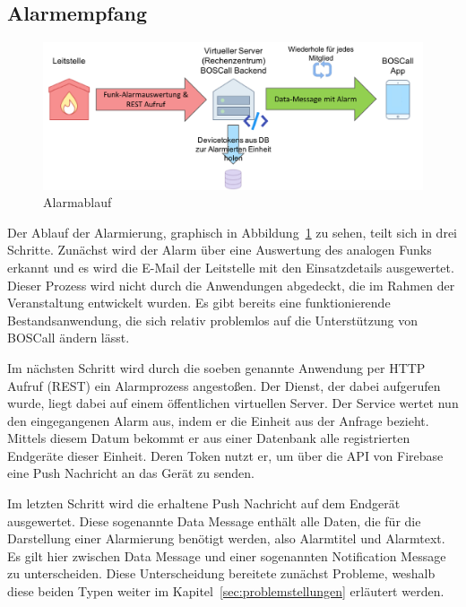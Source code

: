 \subsection{Alarmempfang}
\begin{figure}[H]
	\centering
	\includegraphics[width=\linewidth]{include/img/alarmablauf}
	\caption{Alarmablauf}
	\label{fig:alarmablauf}
\end{figure}
Der Ablauf der Alarmierung, graphisch in Abbildung~\ref{fig:alarmablauf} zu sehen, teilt sich in drei Schritte. Zunächst wird der Alarm über eine Auswertung des analogen Funks erkannt und es wird die E-Mail der Leitstelle mit den Einsatzdetails ausgewertet. Dieser Prozess wird nicht durch die Anwendungen abgedeckt, die im Rahmen der Veranstaltung entwickelt wurden. Es gibt bereits eine funktionierende Bestandsanwendung, die sich relativ problemlos auf die Unterstützung von BOSCall ändern lässt.

Im nächsten Schritt wird durch die soeben genannte Anwendung per HTTP Aufruf (REST) ein Alarmprozess angestoßen. Der Dienst, der dabei aufgerufen wurde, liegt dabei auf einem öffentlichen virtuellen Server. Der Service wertet nun den eingegangenen Alarm aus, indem er die Einheit aus der Anfrage bezieht. Mittels diesem Datum bekommt er aus einer Datenbank alle registrierten Endgeräte dieser Einheit. Deren Token nutzt er, um über die API von Firebase eine Push Nachricht an das Gerät zu senden.

Im letzten Schritt wird die erhaltene Push Nachricht auf dem Endgerät ausgewertet. Diese sogenannte Data Message enthält alle Daten, die für die Darstellung einer Alarmierung benötigt werden, also Alarmtitel und Alarmtext. Es gilt hier zwischen Data Message und einer sogenannten Notification Message zu unterscheiden. Diese Unterscheidung bereitete zunächst Probleme, weshalb diese beiden Typen weiter im Kapitel~\ref{sec:problemstellungen} erläutert werden.

